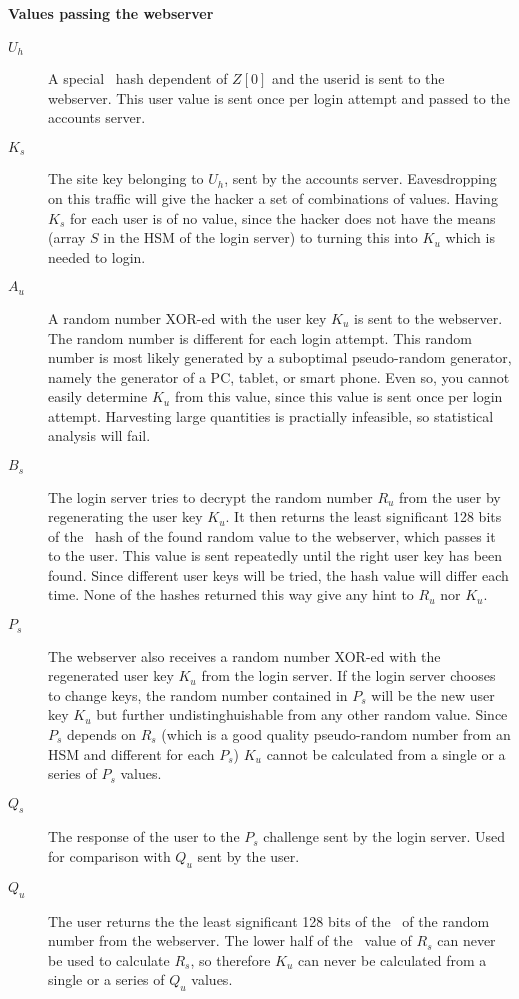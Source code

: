 \paragraph{Values passing the webserver}
\begin{description}
\item[$U_h$]	A special \SHA\ hash dependent of $Z[0]$ and the userid is sent to the webserver.
				This user value is sent once per login attempt and passed to the accounts server.
\item[$K_s$]	The site key belonging to $U_h$, sent by the accounts server.
				Eavesdropping on this traffic will give the hacker a set of combinations of values.
				Having $K_s$ for each user is of no value, since the hacker does not have the means
				(array $S$ in the HSM of the login server)
				to turning this into $K_u$ which is needed to login.
\item[$A_u$]	A random number XOR-ed with the user key $K_u$ is sent to the webserver.
				The random number is different for each login attempt.
				This random number is most likely generated by a suboptimal pseudo-random generator,
				namely the generator of a PC, tablet, or smart phone.
				Even so, you cannot easily determine $K_u$ from this value,
				since this value is sent once per login attempt.
				Harvesting large quantities is practially infeasible,
				so statistical analysis will fail.
\item[$B_s$]	The login server tries to decrypt the random number $R_u$ from the user by regenerating the user key $K_u$.
				It then returns the least significant 128 bits of the \SHA\ hash of the found random value to the webserver,
				which passes it to the user.
				This value is sent repeatedly until the right user key has been found.
				Since different user keys will be tried, the hash value will differ each time.
				None of the hashes returned this way give any hint to $R_u$ nor $K_u$.
\item[$P_s$]	The webserver also receives a random number XOR-ed with the regenerated user key $K_u$ from the login server.
				If the login server chooses to change keys,
				the random number contained in $P_s$ will be the new user key $K_u$
				but further undistinghuishable from any other random value.
				Since $P_s$ depends on $R_s$
				(which is a good quality pseudo-random number from an HSM and different for each $P_s$)
				$K_u$ cannot be calculated from a single or a series of $P_s$ values.
\item[$Q_s$]	The response of the user to the $P_s$ challenge sent by the login server.
				Used for comparison with $Q_u$ sent by the user.
\item[$Q_u$]	The user returns the the least significant 128 bits of the \SHA\ of the random number from the webserver.
				The lower half of the \SHA\ value of $R_s$ can never be used to calculate $R_s$,
				so therefore $K_u$ can never be calculated from a single or a series of $Q_u$ values.
\end{description}
